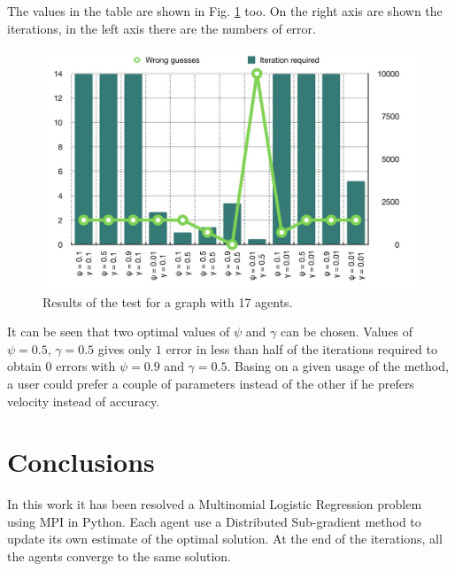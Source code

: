 \documentclass[a4paper,11pt,oneside]{book}
\begin{document}
The values in the table are shown in Fig. \ref{17_agents_performance} too. On the right axis are shown the iterations, in the left axis there are the numbers of error.

\begin{figure}[h]
	\centering
	\includegraphics[scale=0.24]{figs/graphs_17_agents_performance}
	\caption{Results of the test for a graph with 17 agents.}
	\label{17_agents_performance}
\end{figure}

It can be seen that two optimal values of $\psi$ and $\gamma$ can be chosen.
Values of $\psi=0.5$, $\gamma=0.5$ gives only $1$ error in less than half of the iterations required to obtain $0$ errors with $\psi=0.9$ and $\gamma=0.5$. Basing on a given usage of the method, a user could prefer a couple of parameters instead of the other if he prefers velocity instead of accuracy.


\chapter*{Conclusions} %
In this work it has been resolved a Multinomial Logistic Regression problem using MPI in Python. Each agent use a Distributed Sub-gradient method to update its own estimate of the optimal solution. At the end of the iterations, all the agents converge to the same solution.


{}
   
\end{document}
